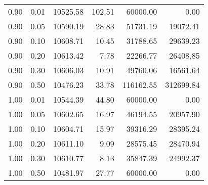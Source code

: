 \begin{table}
\begin{tabular}{rrrrrr}
0.90 & 0.01 & 10525.58 & 102.51 & 60000.00 & 0.00 \\
0.90 & 0.05 & 10590.19 & 28.83 & 51731.19 & 19072.41 \\
0.90 & 0.10 & 10608.71 & 10.45 & 31788.65 & 29639.23 \\
0.90 & 0.20 & 10613.42 & 7.78 & 22266.77 & 26408.85 \\
0.90 & 0.30 & 10606.03 & 10.91 & 49760.06 & 16561.64 \\
0.90 & 0.50 & 10476.23 & 33.78 & 116162.55 & 312699.84 \\
1.00 & 0.01 & 10544.39 & 44.80 & 60000.00 & 0.00 \\
1.00 & 0.05 & 10602.65 & 16.97 & 46194.55 & 20957.90 \\
1.00 & 0.10 & 10604.71 & 15.97 & 39316.29 & 28395.24 \\
1.00 & 0.20 & 10611.10 & 9.09 & 28575.45 & 28470.94 \\
1.00 & 0.30 & 10610.77 & 8.13 & 35847.39 & 24992.37 \\
1.00 & 0.50 & 10481.97 & 27.77 & 60000.00 & 0.00 \\
\bottomrule
\end{tabular}
\end{table}
